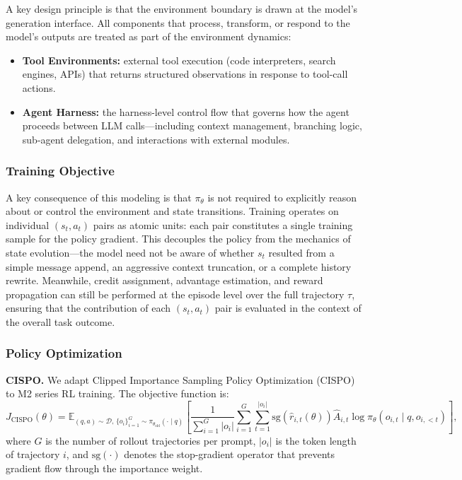 A key design principle is that the environment boundary is drawn at the model's generation interface. All components that process, transform, or respond to the model's outputs are treated as part of the environment dynamics:
\begin{itemize}
    \item \textbf{Tool Environments:} external tool execution (code interpreters, search engines, APIs) that returns structured observations in response to tool-call actions.
    \item \textbf{Agent Harness:} the harness-level control flow that governs how the agent proceeds between LLM calls---including context management, branching logic, sub-agent delegation, and interactions with external modules.
\end{itemize}

\subsubsection{Training Objective}

A key consequence of this modeling is that $\pi_\theta$ is not required to explicitly reason about or control the environment and state transitions. Training operates on individual $(s_t, a_t)$ pairs as atomic units: each pair constitutes a single training sample for the policy gradient. This decouples the policy from the mechanics of state evolution---the model need not be aware of whether $s_t$ resulted from a simple message append, an aggressive context truncation, or a complete history rewrite. Meanwhile, credit assignment, advantage estimation, and reward propagation can still be performed at the episode level over the full trajectory $\tau$, ensuring that the contribution of each $(s_t, a_t)$ pair is evaluated in the context of the overall task outcome.

\subsubsection{Policy Optimization}

\noindent \textbf{CISPO.} We adapt Clipped Importance Sampling Policy Optimization (CISPO)~\citep{minimax2025m1} to M2 series RL training. The objective function is:
\begin{equation}
J_{\text{CISPO}}(\theta) = \mathbb{E}_{(q,a) \sim \mathcal{D},\, \{o_i\}_{i=1}^G \sim \pi_{\theta_{\text{old}}}(\cdot \mid q)} \left[ \frac{1}{\sum_{i=1}^G |o_i|} \sum_{i=1}^G \sum_{t=1}^{|o_i|} \mathrm{sg}\!\left(\hat{r}_{i,t}(\theta)\right) \hat{A}_{i,t} \log \pi_\theta(o_{i,t} \mid q, o_{i,<t}) \right],
\end{equation}
where $G$ is the number of rollout trajectories per prompt, $|o_i|$ is the token length of trajectory $i$, and $\mathrm{sg}(\cdot)$ denotes the stop-gradient operator that prevents gradient flow through the importance weight.

